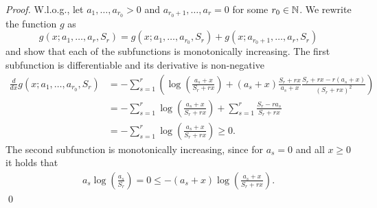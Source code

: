 \begin{proof}
W.l.o.g., let $a_1,\ldots,a_{r_0}>0$ and $a_{r_0+1},\ldots,a_r=0$ for some $r_0\in \mathbb{N}$. We rewrite the function $g$ as
\[g(x;a_1,\ldots,a_r,S_r)=g(x;a_1,\ldots,a_{r_0},S_r)+g(x;a_{r_0+1},\ldots,a_r,S_r)\]
and show that each of  the subfunctions is monotonically increasing.
The first subfunction is differentiable and its derivative is non-negative
\begin{align*}
\frac{d}{dx}g(x;a_1,\ldots,a_{r_0},S_r) &= -\sum_{s=1}^r\left(\log\left(\frac{a_s+x}{S_r+rx}\right)+(a_s+x)\frac{S_r+rx}{a_s+x}\frac{S_r+rx-r(a_s+x)}{(S_r+rx)^2}\right)\\
&= -\sum_{s=1}^r\log\left(\frac{a_s+x}{S_r+rx}\right)+\sum_{s=1}^r\frac{S_r-ra_s}{S_r+rx}\\
&= -\sum_{s=1}^r\log\left(\frac{a_s+x}{S_r+rx}\right)\geq 0.
\end{align*}
The second subfunction is monotonically increasing, since for $a_s=0$ and all $x\geq 0$ it holds that
\begin{align*}
	a_s\log\left(\frac{a_s}{S_r}\right)=0\leq -(a_s+x)\log\left(\frac{a_s+x}{S_r+rx}\right).
\end{align*}
\qed
\end{proof}
\BoundLCT*
